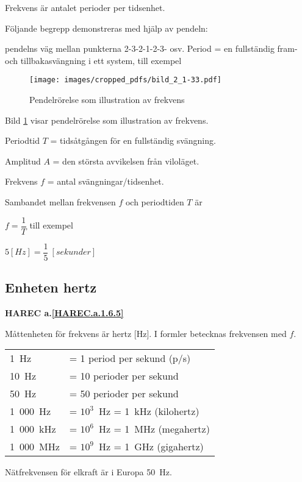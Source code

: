 Frekvens är antalet perioder per tidsenhet.

Följande begrepp demonstreras med hjälp av pendeln:

pendelns väg mellan punkterna 2-3-2-1-2-3- osv.
Period = en fullständig fram- och tillbakasvängning i ett system, till exempel

\begin{figure}[ht]
\texttt{[image: images/cropped\_pdfs/bild\_2\_1-33.pdf]}
\caption{Pendelrörelse som illustration av frekvens}
\label{fig:BildII1-33}
\end{figure}

Bild \ref{fig:BildII1-33} visar pendelrörelse som illustration av frekvens.

Periodtid \(T\) = tidsåtgången för en fullständig svängning.

Amplitud \(A\) = den största avvikelsen från viloläget.

Frekvens \(f\) = antal svängningar/tidsenhet.

Sambandet mellan frekvensen \(f\) och periodtiden \(T\) är

\(f=\dfrac{1}{T}\) till exempel

\(5 [H z] = \dfrac{1}{5}\ [sekunder]\)

\subsection{Enheten hertz}
\textbf{HAREC a.\ref{HAREC.a.1.6.5}\label{myHAREC.a.1.6.5}}

Måttenheten för frekvens är hertz [Hz].
I formler betecknas frekvensen med \(f\).

\begin{center}
\begin{tabular}{ll}
1~Hz      & = 1 period per sekund (p/s) \\
10~Hz     & = 10 perioder per sekund \\
50~Hz     & = 50 perioder per sekund \\
1~000~Hz  & = \(10^3\)~Hz = 1~kHz (kilohertz) \\
1~000~kHz & = \(10^6\)~Hz = 1~MHz (megahertz) \\
1~000~MHz & = \(10^9\)~Hz = 1~GHz (gigahertz) \\
\end{tabular}
\end{center}

Nätfrekvensen för elkraft är i Europa 50~Hz.

